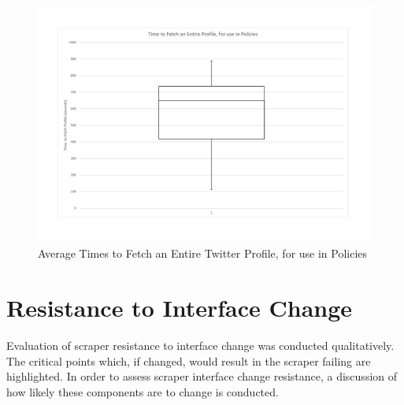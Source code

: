 \begin{center}
\begin{figure}[h!]
\centering
\includegraphics[width=500px]{Images/Average_Time_To_Fetch_Profile.pdf}
\caption{Average Times to Fetch an Entire Twitter Profile, for use in Policies}
\label{fig:av_time_fetch}
\end{figure}
\end{center}









\section{Resistance to Interface Change}

Evaluation of scraper resistance to interface change was conducted qualitatively. The critical points which, if changed, would result in the scraper failing are highlighted. In order to assess scraper interface change resistance, a discussion of how likely these components are to change is conducted.


